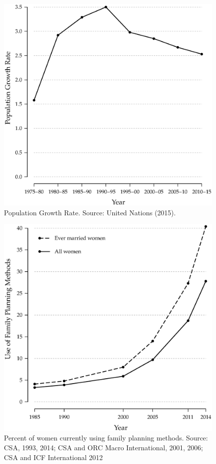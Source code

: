 \documentclass[a4paper, twocolumn]{article}
\begin{document}
\begin{figure}[!hbtp]
\includegraphics[width = \columnwidth]{../figures/fig4.eps}
\caption{Population Growth Rate. Source: United Nations (2015).}\label{Fig:4}
\end{figure}



\begin{figure}[!hbtp]
\includegraphics[width = \columnwidth]{../figures/fig5.eps}
\caption{Percent of women currently using family planning methods. Source: CSA, 1993, 2014; CSA and ORC Macro International, 2001, 2006; CSA and ICF International 2012}
\end{figure}
\end{document}
